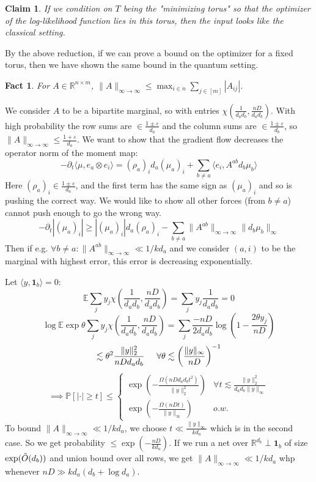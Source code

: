 \documentclass{article}
\newtheorem{fact}[theorem]{Fact}
\newtheorem{claim}[theorem]{Claim}
\newcommand{\R}{{\mathbb{R}}}
\renewcommand{\vec}{\bm}
\newcommand{\E}{\mathbb{E}}
\renewcommand{\Pr}{\mathbb{P}}
\newcommand\eps{\varepsilon}
\begin{document}
\begin{claim}
If we condition on $T$ being the "minimizing torus" so that the optimizer of the log-likelihood function lies in this torus, then the input looks like the classical setting.
\end{claim}

By the above reduction, if we can prove a bound on the optimizer for a fixed torus, then we have shown the same bound in the quantum setting.

\begin{fact}
For $A \in \R^{n \times m}$, $\|A\|_{\infty \to \infty} \leq \max_{i \in n} \sum_{j \in [m]} |A_{ij}|$.
\end{fact}

We consider $A$ to be a bipartite marginal, so with entries $\chi(\frac{1}{d_{a} d_{b}}, \frac{nD}{d_{a} d_{b}})$. With high probability the row sums are $\in \frac{1 \pm \eps}{d_{a}}$ and the column sums are $\in \frac{1 \pm \eps}{d_{b}}$, so $\|A\|_{\infty \to \infty} \leq \frac{1+\eps}{d_{a}}$. We want to show that the gradient flow decreases the operator norm of the moment map:
\[ -\partial_{t} \langle \mu, e_{a} \otimes e_{i} \rangle = (\rho_{a})_{i} d_{a} (\mu_{a})_{i} + \sum_{b \neq a} \langle e_{i} , A^{ab} d_{b} \mu_{b} \rangle    \]
Here $(\rho_{a})_{i} \in \frac{1 \pm \eps}{d_{a}}$, and the first term has the same sign as $(\mu_{a})_{i}$ and so is pushing the correct way. We would like to show all other forces (from $b \neq a$) cannot push enough to go the wrong way.
\[ -\partial_{t} |(\mu_{a})_{i}| \geq |(\mu_{a})_{i}| d_{a} (\rho_{a})_{i} - \sum_{b \neq a} \|A^{ab}\|_{\infty \to \infty} \|d_{b} \mu_{b}\|_{\infty}      \]
Then if e.g. $\forall b \neq a: \|A^{ab}\|_{\infty \to \infty} \ll 1/k d_{a}$ and we consider $(a,i)$ to be the marginal with highest error, this error is decreasing exponentially.

Let $\langle y, \vec{1}_{b} \rangle = 0$:
\[ \E \sum_{j} y_{j} \chi(\frac{1}{d_{a} d_{b}}, \frac{nD}{d_{a} d_{b}}) = \sum_{j} y_{j} \frac{1}{d_{a} d_{b}} = 0   \]
\[ \log \E \exp \theta \sum_{j} y_{j} \chi(\frac{1}{d_{a} d_{b}}, \frac{nD}{d_{a} d_{b}}) = \sum_{j} \frac{-n D}{2d_{a} d_{b}} \log \left( 1 - \frac{2 \theta y_{j}}{n D} \right)    \]
\[ \lesssim \theta^{2} \frac{\|y\|_{2}^{2}}{n D d_{a} d_{b}} \hspace{5mm} \forall \theta \lesssim \left( \frac{\|y\|_{\infty}}{n D}  \right)^{-1}    \]
\[ \implies \Pr [|\cdot| \geq t] \leq \begin{cases}
\exp \left( - \frac{\Omega(n D d_{a} d_{b} t^{2})}{\|y\|_{2}^{2}} \right) & \forall t \lesssim \frac{\|y\|_{2}^{2}}{d_{a} d_{b} \|y\|_{\infty}}
\\ \exp \left( - \frac{ \Omega(n D t) }{\|y\|_{\infty}} \right) & o.w.  \end{cases}   \]
To bound $\|A\|_{\infty \to \infty} \ll 1/k d_{a}$, we choose $t \ll \frac{\|y\|_{\infty}}{k d_{a}}$ which is in the second case. So we get probability $\leq \exp( - \frac{n D}{k d_{a}} )$. If we run a net over $\R^{d_{b}} \perp \vec{1}_{b}$ of size $\exp(\Tilde{O}(d_{b}))$ and union bound over all rows, we get $\|A\|_{\infty \to \infty} \ll 1/k d_{a}$ whp whenever $n D \gg k d_{a}( d_{b} + \log d_{a} ) $.
\end{document}
